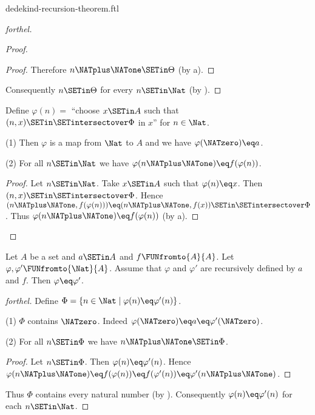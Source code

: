 \documentclass{stex}
\begin{document}
\begin{smodule}{dedekind-recursion-theorem.ftl}
\begin{proof}[forthel]
\begin{proof}
\begin{proof}
      Therefore $n \NATplus \NATone \SETin \Theta$ (by a).
    \end{proof}

    Consequently $n \SETin \Theta$ for every $n \SETin \Nat$ (by ).
  \end{proof}

  Define $\varphi(n) =$ ``choose $x \SETin A$ such that $(n, x) \SETin
  \SETintersectover \Phi$ in $x$'' for $n \in \Nat$.

  (1) Then $\varphi$ is a map from $\Nat$ to $A$ and we have
  $\varphi(\NATzero) \eq a$.

  (2) For all $n \SETin \Nat$ we have $\varphi(n \NATplus \NATone) \eq
  f(\varphi(n))$.
  \begin{proof}
    Let $n \SETin \Nat$.
    Take $x \SETin A$ such that $\varphi(n) \eq x$.
    Then $(n, x) \SETin \SETintersectover \Phi$.
    Hence $(n \NATplus \NATone, f(\varphi(n))) \eq (n \NATplus \NATone, f(x)) \SETin \SETintersectover \Phi$.
    Thus $\varphi(n \NATplus \NATone) \eq f(\varphi(n))$ (by a).
  \end{proof}
\end{proof}

\begin{theorem}[forthel,title=Dedekind's Recursion Theorem: Uniqueness,id=dedekind_uniqueness]
  Let $A$ be a set and $a \SETin A$ and $f \FUNfromto{A}{A}$.
  Let $\varphi, \varphi' \FUNfromto{\Nat}{A}$.
  Assume that $\varphi$ and $\varphi'$ are recursively defined by $a$ and
  $f$.
  Then $\varphi \eq \varphi'$.
\end{theorem}
\begin{proof}[forthel]
  Define $\Phi = \{ n \in \Nat \mid \varphi(n) \eq \varphi'(n) \}$.

  (1) $\Phi$ contains $\NATzero$.
  Indeed $\varphi(\NATzero) \eq a \eq \varphi'(\NATzero)$.

  (2) For all $n \SETin \Phi$ we have $n \NATplus \NATone \SETin \Phi$.
  \begin{proof}
    Let $n \SETin \Phi$.
    Then $\varphi(n) \eq \varphi'(n)$.
    Hence $\varphi(n \NATplus \NATone)
      \eq f(\varphi(n))
      \eq f(\varphi'(n))
      \eq \varphi'(n \NATplus \NATone)$.
    \end{proof}

  Thus $\Phi$ contains every natural number (by ).
  Consequently $\varphi(n) \eq \varphi'(n)$ for each $n \SETin \Nat$.
\end{proof}
\end{smodule}
\end{document}

